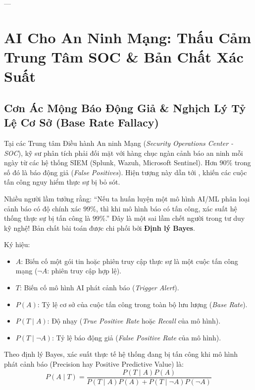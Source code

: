 ---

\section{AI Cho An Ninh Mạng: Thấu Cảm Trung Tâm SOC \& Bản Chất Xác Suất}
\label{sec:ch12-ai-soc}

\subsection{Cơn Ác Mộng Báo Động Giả \& Nghịch Lý Tỷ Lệ Cơ Sở (Base Rate Fallacy)}
Tại các Trung tâm Điều hành An ninh Mạng (\textit{Security Operations Center - SOC}), kỹ sư phân tích phải đối mặt với hàng chục ngàn cảnh báo an ninh mỗi ngày từ các hệ thống SIEM (Splunk, Wazuh, Microsoft Sentinel). Hơn $90\%$ trong số đó là báo động giả (\textit{False Positives}). Hiện tượng này dẫn tới , khiến các cuộc tấn công nguy hiểm thực sự bị bỏ sót.

Nhiều người lầm tưởng rằng: ``Nếu ta huấn luyện một mô hình AI/ML phân loại cảnh báo có độ chính xác $99\%$, thì khi mô hình báo có tấn công, xác suất hệ thống thực sự bị tấn công là $99\%$.'' Đây là một sai lầm chết người trong tư duy kỹ nghệ! Bản chất bài toán được chi phối bởi \textbf{Định lý Bayes}.

\begin{theorem}
Ký hiệu:
\begin{itemize}
  \item $A$: Biến cố một gói tin hoặc phiên truy cập thực sự là một cuộc tấn công mạng ($\neg A$: phiên truy cập hợp lệ).
  \item $T$: Biến cố mô hình AI phát cảnh báo (\textit{Trigger Alert}).
  \item $P(A)$: Tỷ lệ cơ sở của cuộc tấn công trong toàn bộ lưu lượng (\textit{Base Rate}).
  \item $P(T \mid A)$: Độ nhạy (\textit{True Positive Rate} hoặc \textit{Recall} của mô hình).
  \item $P(T \mid \neg A)$: Tỷ lệ báo động giả (\textit{False Positive Rate} của mô hình).
\end{itemize}
Theo định lý Bayes, xác suất thực tế hệ thống đang bị tấn công khi mô hình phát cảnh báo (Precision hay Positive Predictive Value) là:
\begin{equation}
P(A \mid T) = \frac{P(T \mid A) P(A)}{P(T \mid A) P(A) + P(T \mid \neg A) P(\neg A)}
\end{equation}
\end{theorem}

